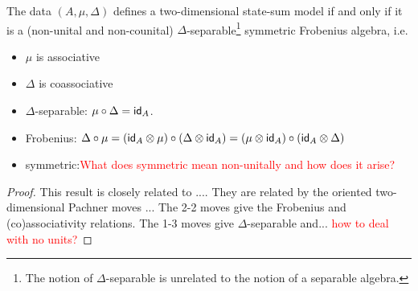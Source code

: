 \begin{lemma}
    The data $(A,\mu,\Delta)$ defines a two-dimensional state-sum model if and only if it is a (non-unital and non-counital) $\Delta$-separable\footnote{The notion of $\Delta$-separable is unrelated to the notion of a separable algebra.} symmetric Frobenius algebra, i.e.
    \begin{itemize}
        \item $\mu$ is associative
        \item $\Delta$ is coassociative
        \item $\Delta$-separable: $\mu \circ \Delta = \mathsf{id}_A$.
        \item Frobenius: $\Delta \circ \mu = (\mathsf{id}_A \otimes \mu) \circ (\Delta \otimes \mathsf{id}_A) = (\mu \otimes \mathsf{id}_A) \circ (\mathsf{id}_A \otimes \Delta)$
        \item symmetric:\textcolor{red}{What does symmetric mean non-unitally and how does it arise?}
    \end{itemize}
\end{lemma}
\begin{proof}
    This result is closely related to \cite[Proposition 3.4]{carqueville2016orbifoldcompletion}....
    They are related by the oriented two-dimensional Pachner moves \cite[Example 3.4(i)]{carqueville2019orbifolds}...
    The 2-2 moves give the Frobenius and (co)associativity relations.
    The 1-3 moves give $\Delta$-separable and... \textcolor{red}{how to deal with no units?}
\end{proof}
